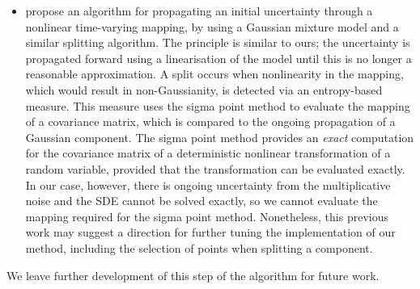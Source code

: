 \begin{itemize}
	\item \citet{DeMarsEtAl_2013_EntropyBasedApproachUncertainty} propose an algorithm for propagating an initial uncertainty through a nonlinear time-varying mapping, by using a Gaussian mixture model and a similar splitting algorithm.
	      The principle is similar to ours; the uncertainty is propagated forward using a linearisation of the model until this is no longer a reasonable approximation.
	      A split occurs when nonlinearity in the mapping, which would result in non-Gaussianity, is detected via an entropy-based measure.
	      This measure uses the sigma point method to evaluate the mapping of a covariance matrix, which is compared to the ongoing propagation of a Gaussian component.
	      The sigma point method provides an \emph{exact} computation for the covariance matrix of a deterministic nonlinear transformation of a random variable, provided that the transformation can be evaluated exactly.
	      In our case, however, there is ongoing uncertainty from the multiplicative noise and the SDE cannot be solved exactly, so we cannot evaluate the mapping required for the sigma point method.
	      Nonetheless, this previous work may suggest a direction for further tuning the implementation of our method, including the selection of points when splitting a component.

\end{itemize}
We leave further development of this step of the algorithm for future work.





